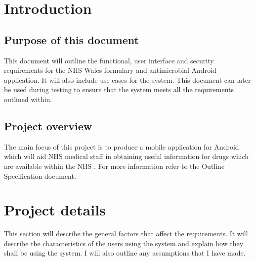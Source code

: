 \documentclass[11pt,fleqn,twoside]{article}
\begin{document}
\wordcount{}

\mmp

\setcounter{tocdepth}{3} %


\section{Introduction}
\subsection{Purpose of this document}
This document will outline the functional, user interface and security requirements for the NHS Wales formulary and antimicrobial Android application. It will also include use cases for the system. This document can later be used during testing to ensure that the system meets all the requirements outlined within.


\subsection{Project overview}
The main focus of this project is to produce a mobile application for Android which will aid NHS medical staff in obtaining useful information for drugs which are available within the NHS . For more information refer to the Outline Specification document.


\section{Project details}
This section will describe the general factors that affect the requirements. It will describe the characteristics of the users using the system and explain how they shall be using the system. I will also outline any assumptions that I have made.
\end{document}
